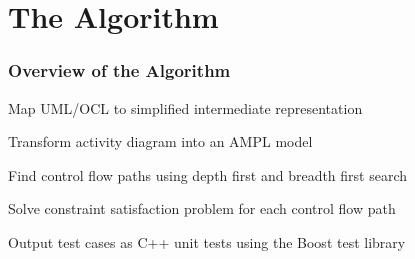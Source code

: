 \documentclass{beamer}
\begin{document}
\section{The Algorithm}
\begin{frame}
\frametitle{Overview of the Algorithm}
\begin{block}{}
Map UML/OCL to simplified intermediate representation
\end{block}
\begin{block}{}
Transform activity diagram into an AMPL model
\end{block}
\begin{block}{}
Find control flow paths using depth first and breadth first search
\end{block}
\begin{block}{}
Solve constraint satisfaction problem for each control flow path
\end{block}
\begin{block}{}
Output test cases as C++ unit tests using the Boost test library
\end{block}
\end{frame}
\end{document}
